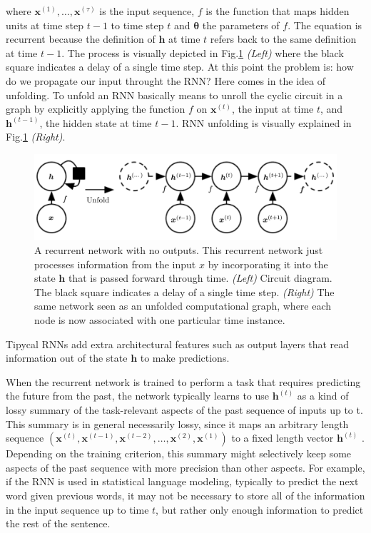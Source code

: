 where $\bm{x}^{(1)}, \ldots, \bm{x}^{(\tau)}$ is the input sequence,
$f$ is the function that maps hidden units at time step $t - 1$ to
time step $t$ and $\bm{\theta}$ the parameters of $f$. The equation is
recurrent because the deﬁnition of $\bm{h}$ at time $t$ refers back to
the same deﬁnition at time $t - 1$. The process is visually depicted
in Fig.\ref{fig:rnn-with-unfold} \emph{(Left)} where the black square
indicates a delay of a single time step. At this point the problem is:
how do we propagate our input throught the RNN? Here comes in the idea
of unfolding. To unfold an RNN basically means to unroll the cyclic
circuit in a graph by explicitly applying the function $f$ on
$\bm{x}^{(t)}$, the input at time $t$, and $\bm{h}^{(t-1)}$, the
hidden state at time $t - 1$. RNN unfolding is visually explained in
Fig.\ref{fig:rnn-with-unfold} \emph{(Right)}.

\begin{figure}[H]
  \centering
  \includegraphics[width=.8\textwidth]{figures/rnn-with-unfold.png}
  \caption[Recurrent network circuit diagram and unfolded computational graph]{
    A recurrent network with no outputs. This recurrent network just
    processes information from the input $x$ by incorporating it into
    the state $\bm{h}$ that is passed forward through
    time.\cite{goodfellow2016deep} \textit{(Left)} Circuit diagram.
    The black square indicates a delay of a single time step.
    \textit{(Right)} The same network seen as an unfolded
    computational graph, where each node is now associated with one
    particular time instance.
  }
  \label{fig:rnn-with-unfold}
\end{figure}

Tipycal RNNs add extra architectural features such as output layers
that read information out of the state $\bm{h}$ to make predictions.

When the recurrent network is trained to perform a task that requires
predicting the future from the past, the network typically learns to
use $\bm{h}^{(t)}$ as a kind of lossy summary of the task-relevant
aspects of the past sequence of inputs up to t. This summary is in
general necessarily lossy, since it maps an arbitrary length sequence
$( \bm{x}^{(t)}, \bm{x}^{(t-1)}, \bm{x}^{(t-2)} , \ldots ,
\bm{x}^{(2)}, \bm{x}^{(1)} )$ to a ﬁxed length vector $\bm{h}^{(t)}$ .
Depending on the training criterion, this summary might selectively
keep some aspects of the past sequence with more precision than other
aspects. For example, if the RNN is used in statistical language
modeling, typically to predict the next word given previous words, it
may not be necessary to store all of the information in the input
sequence up to time $t$, but rather only enough information to predict
the rest of the sentence.

